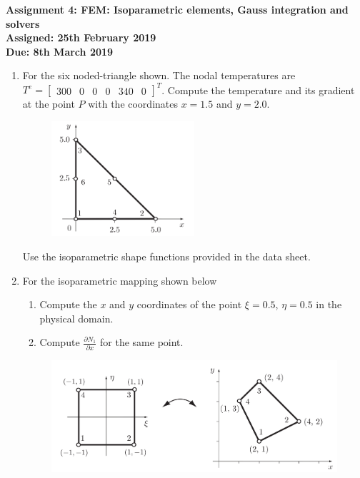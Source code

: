 \documentclass[a4paper,12pt]{article}
\begin{document}
\begin{centering}
	\textbf{
		Assignment 4: FEM: Isoparametric elements, Gauss integration and solvers\\
		Assigned: 25th February 2019\\
		Due: 8th March 2019\\
	}
\end{centering}

\vspace{1em}
 
\begin{enumerate}

	\item For the six noded-triangle shown. The nodal temperatures are $T^e = \begin{bmatrix}300 & 0 & 0 & 0 & 340 & 0 \end{bmatrix}^T$. Compute the temperature and its gradient at the point $P$ with the coordinates $x = 1.5$ and $y = 2.0$.

		
		\begin{figure}[!h]
			\centering
			\includegraphics[width=0.5\textwidth]{figs/6noded-triangle.png}
		\end{figure}

	Use the isoparametric shape functions provided in the data sheet.
	
	
	\item For the isoparametric mapping shown below
		\begin{enumerate}
			\item Compute the $x$ and $y$ coordinates of the point $\xi = 0.5$, $\eta = 0.5$ in the physical domain.
			\item Compute $\frac{\partial N_1}{\partial x}$ for the same point.
		\end{enumerate}
		
		\begin{figure}[!h]
			\centering
			\includegraphics[width=\textwidth]{figs/isoparametric-mapping.png}
		\end{figure}
	

\end{enumerate}
\end{document}

